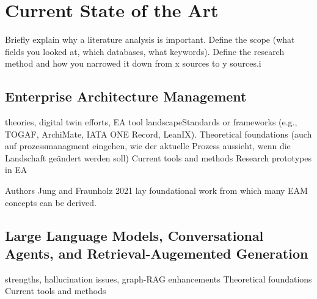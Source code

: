 \chapter{Current State of the Art}
\label{ch:SOTA}
Briefly explain why a literature analysis is important. Define the scope (what fields you looked at, which databases, what keywords). Define the research method and how you narrowed it down from x sources to y sources.i




%
%
\section{Enterprise Architecture Management}
\label{sec:intro:eam}
theories, digital twin efforts, EA tool landscapeStandards or frameworks (e.g., TOGAF, ArchiMate, IATA ONE Record, LeanIX).
Theoretical foundations (auch auf prozessmanagment eingehen, wie der aktuelle Prozess aussieht, wenn die Landschaft geändert werden soll)
Current tools and methods
Research prototypes in EA

Authors Jung and Fraunholz 2021 \cite{jung2021masterclass} lay foundational work from which many EAM concepts can be derived.


%
%
\section{Large Language Models, Conversational Agents, and Retrieval-Augemented Generation}
\label{sec:intro:llmandrag}
strengths, hallucination issues, graph-RAG enhancements
Theoretical foundations
Current tools and methods

